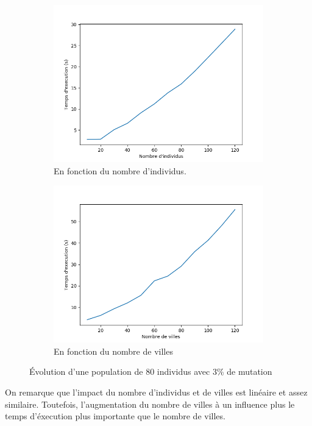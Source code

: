 \documentclass[11pt]{article}
\begin{document}
\begin{figure}[h]
    \begin{subfigure}{.5\textwidth}
        \includegraphics[width=.9\linewidth]{./time.png}
        \caption{En fonction du nombre d'individus.}
    \end{subfigure}
    \begin{subfigure}{.5\textwidth}
        \includegraphics[width=.9\linewidth]{./cities.png}
        \caption{En fonction du nombre de villes}
    \end{subfigure}
    \caption{Évolution d'une population de 80 individus avec 3\% de mutation}
\end{figure}

On remarque que l'impact du nombre d'individus et de villes est linéaire et assez similaire. Toutefois,
l'augmentation du nombre de villes à un influence plus le temps d'éxecution plus importante que
le nombre de villes.
\end{document}
